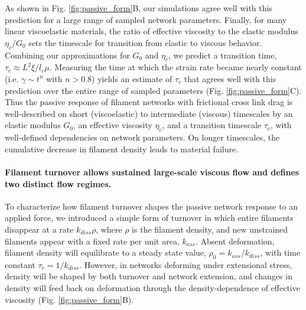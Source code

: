 \documentclass[10pt,letterpaper]{article}
\begin{document}
As shown in Fig. \ref{fig:passive_form}B, our simulations agree well with this prediction for a large range of sampled network parameters. Finally, for many linear viscoelastic materials, the ratio of effective viscosity to the elastic modulus $\eta_c/G_0$ sets the timescale for transition from elastic to viscous behavior\cite{mccrum1997principles}. Combining our approximations for $G_0$ and $\eta_c$, we predict a transition time, $\tau_c \approx L^2\xi/l_c\mu$. Measuring the time at which the strain rate became nearly constant (i.e. $\gamma \sim t^n$ with $n>0.8$) yields an estimate of $\tau_c$ that agrees well with this prediction over the entire range of sampled parameters (Fig. \ref{fig:passive_form}C).  Thus the passive response of filament networks with frictional cross link drag is well-described on short (viscoelastic) to intermediate (viscous) timescales by an elastic modulus $G_0$, an effective viscosity $\eta_c$, and a transition timescale $\tau_c$, with well-defined dependencies on network parameters. On longer timescales, the cumulative decrease in filament density leads to material failure.

\paragraph{Filament turnover allows sustained large-scale viscous flow and defines two distinct flow regimes.} 
 

To characterize how filament turnover shapes the passive network response to an applied force, we introduced a simple form of turnover in which entire filaments disappear at a rate $k_{diss}\rho$, where $\rho$ is the filament density, and new unstrained filaments appear with a fixed rate per unit area, $k_{ass}$. Absent deformation,  filament density will equilibrate to a steady state value, $\rho_0 = k_{ass}/k_{diss}$, with time constant $\tau_r = 1/k_{diss}$.  However, in networks deforming under extensional stress, density will be shaped by both turnover and network extension, and changes in density will feed back on deformation through the density-dependence of effective viscosity (Fig. \ref{fig:passive_form}B). 
\end{document}
